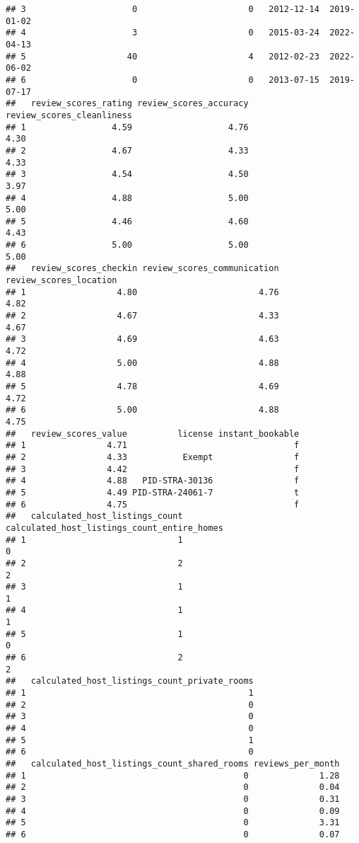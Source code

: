 \documentclass[
]{article}
\begin{document}
\begin{verbatim}
## 3                     0                      0   2012-12-14  2019-01-02
## 4                     3                      0   2015-03-24  2022-04-13
## 5                    40                      4   2012-02-23  2022-06-02
## 6                     0                      0   2013-07-15  2019-07-17
##   review_scores_rating review_scores_accuracy review_scores_cleanliness
## 1                 4.59                   4.76                      4.30
## 2                 4.67                   4.33                      4.33
## 3                 4.54                   4.50                      3.97
## 4                 4.88                   5.00                      5.00
## 5                 4.46                   4.60                      4.43
## 6                 5.00                   5.00                      5.00
##   review_scores_checkin review_scores_communication review_scores_location
## 1                  4.80                        4.76                   4.82
## 2                  4.67                        4.33                   4.67
## 3                  4.69                        4.63                   4.72
## 4                  5.00                        4.88                   4.88
## 5                  4.78                        4.69                   4.72
## 6                  5.00                        4.88                   4.75
##   review_scores_value          license instant_bookable
## 1                4.71                                 f
## 2                4.33           Exempt                f
## 3                4.42                                 f
## 4                4.88   PID-STRA-30136                f
## 5                4.49 PID-STRA-24061-7                t
## 6                4.75                                 f
##   calculated_host_listings_count calculated_host_listings_count_entire_homes
## 1                              1                                           0
## 2                              2                                           2
## 3                              1                                           1
## 4                              1                                           1
## 5                              1                                           0
## 6                              2                                           2
##   calculated_host_listings_count_private_rooms
## 1                                            1
## 2                                            0
## 3                                            0
## 4                                            0
## 5                                            1
## 6                                            0
##   calculated_host_listings_count_shared_rooms reviews_per_month
## 1                                           0              1.28
## 2                                           0              0.04
## 3                                           0              0.31
## 4                                           0              0.09
## 5                                           0              3.31
## 6                                           0              0.07
\end{verbatim}
\end{document}
